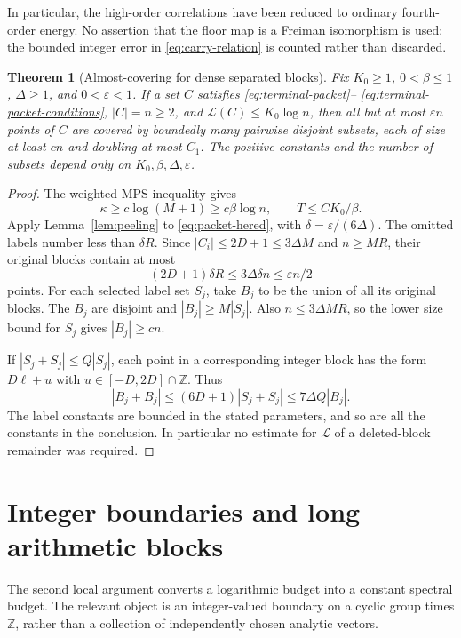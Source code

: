 \documentclass[11pt,reqno]{amsart}
\numberwithin{equation}{section}
\newtheorem{theorem}{Theorem}[section]
\theoremstyle{definition}
\theoremstyle{remark}
\newcommand{\Z}{\mathbb Z}
\newcommand{\La}{\mathcal L}
\newcommand{\eps}{\varepsilon}
\begin{document}
In particular, the high-order correlations have been reduced to ordinary
fourth-order energy. No assertion that the floor map is a Freiman
isomorphism is used: the bounded integer error in
\eqref{eq:carry-relation} is counted rather than discarded.

\begin{theorem}[Almost-covering for dense separated blocks]
\label{thm:packet-cover}
Fix $K_0\ge1$, $0<\beta\le1$, $\Delta\ge1$, and $0<\eps<1$.
If a set $C$ satisfies \eqref{eq:terminal-packet}--
\eqref{eq:terminal-packet-conditions}, $|C|=n\ge2$, and
$\La(C)\le K_0\log n$, then all but at most $\eps n$ points of $C$
are covered by boundedly many pairwise disjoint subsets, each of size
at least $cn$ and doubling at most $C_1$. The positive constants and
the number of subsets depend only on $K_0,\beta,\Delta,\eps$.
\end{theorem}
\begin{proof}
The weighted MPS inequality gives
\[
 \kappa\ge c\log(M+1)\ge c\beta\log n,
 \qquad T\le CK_0/\beta.
\]
Apply Lemma~\ref{lem:peeling} to \eqref{eq:packet-hered}, with
$\delta=\eps/(6\Delta)$. The omitted labels number less than
$\delta R$. Since $|C_i|\le2D+1\le3\Delta M$ and $n\ge MR$,
their original blocks contain at most
\[
 (2D+1)\delta R\le3\Delta\delta n\le\eps n/2
\]
points. For each selected label set $S_j$, take $B_j$ to be the union
of all its original blocks. The $B_j$ are disjoint and
$|B_j|\ge M|S_j|$. Also $n\le3\Delta MR$, so the lower size bound for
$S_j$ gives $|B_j|\ge cn$.

If $|S_j+S_j|\le Q|S_j|$, each point in a corresponding integer block
has the form $D\ell+u$ with $u\in[-D,2D]\cap\Z$. Thus
\[
 |B_j+B_j|\le(6D+1)|S_j+S_j|
 \le7\Delta Q|B_j|.
\]
The label constants are bounded in the stated parameters, and so are
all the constants in the conclusion. In particular no estimate for
$\La$ of a deleted-block remainder was required.
\end{proof}

\section{Integer boundaries and long arithmetic blocks}\label{sec:boundary}

The second local argument converts a logarithmic budget into a constant
spectral budget. The relevant object is an integer-valued boundary on a
cyclic group times $\Z$, rather than a collection of independently
chosen analytic vectors.
\end{document}
